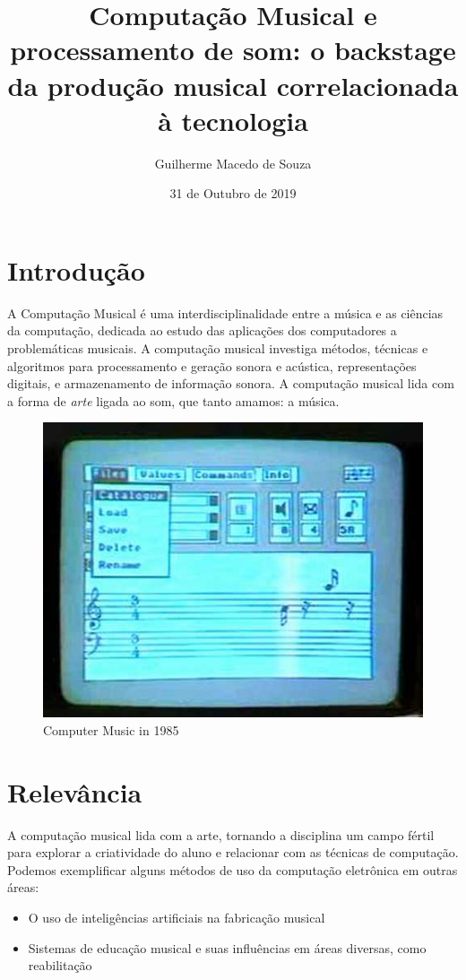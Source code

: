\documentclass[10pt]{article}
\title{Computação Musical e processamento de som: o backstage da produção musical correlacionada à tecnologia}
\author{Guilherme Macedo de Souza}
\date{31 de Outubro de 2019}
\begin{document}
\maketitle

\section {Introdução}
\hspace{0.5in} A Computação Musical é uma interdisciplinalidade entre a música e as ciências da computação, dedicada ao estudo das aplicações dos computadores a problemáticas musicais. A computação musical investiga métodos, técnicas e algoritmos para processamento e geração sonora e acústica, representações digitais, e armazenamento de informação sonora. A computação musical lida com a forma de \textit{arte} ligada ao som, que tanto amamos: a música.
\begin{figure}[h!]
\centering
\includegraphics[scale=0.7]{hqdefault.jpg}
    \caption{Computer Music in 1985\hspace{0.02in}\cite{videocomputermusic}}
\label{fig:hqdefault}
\end{figure}
\section{Relevância}
\hspace {0.5in} A computação musical lida com a arte, tornando a disciplina um campo fértil para explorar a criatividade do aluno e relacionar com as técnicas de computação. Podemos exemplificar alguns métodos de uso da computação eletrônica em outras áreas:\begin{itemize}
    \item O uso de inteligências artificiais na fabricação musical\hspace{0.05in}\cite{miranda2013readings}\cite{ufpewebsite}
    \item Sistemas de educação musical e suas influências em áreas diversas, como reabilitação\hspace{0.05in}\cite{portaleducacaowebsite}
\end{itemize}
\end{document}
